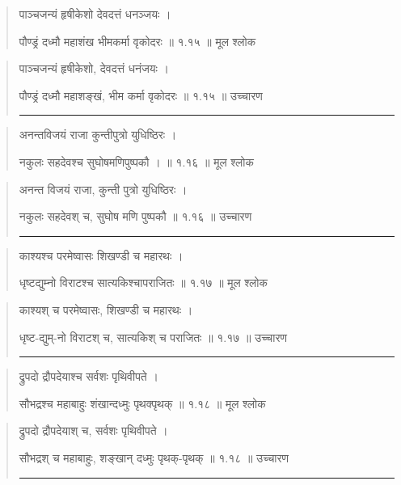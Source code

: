 \begin{quotation} 

पाञ्चजन्यं हृषीकेशो देवदत्तं धनञ्जयः  ।  

पौण्ड्रं दध्मौ महाशंख भीमकर्मा वृकोदरः  ॥ १.१५ ॥  मूल श्लोक
\end{quotation}

\begin{quotation}

पाञ्चजन्यं हृषीकेशो, देवदत्तं धनंजयः  ।  

पौण्ड्रं दध्मौ महाशङ्खं, भीम कर्मा वृकोदरः  ॥ १.१५ ॥  उच्चारण

\noindent\rule{16cm}{0.4pt} 
\end{quotation}


\begin{quotation} 

अनन्तविजयं राजा कुन्तीपुत्रो युधिष्ठिरः  ।  

नकुलः सहदेवश्च सुघोषमणिपुष्पकौ ।  
  ॥ १.१६ ॥  मूल श्लोक
\end{quotation}

\begin{quotation}

अनन्त विजयं राजा, कुन्ती पुत्रो युधिष्ठिरः  ।  

नकुलः सहदेवश् च, सुघोष मणि पुष्पकौ  ॥ १.१६ ॥  उच्चारण

\noindent\rule{16cm}{0.4pt} 
\end{quotation}


\begin{quotation} 
काश्यश्च परमेष्वासः शिखण्डी च महारथः  ।  

धृष्टद्युम्नो विराटश्च सात्यकिश्चापराजितः  ॥ १.१७ ॥  मूल श्लोक
\end{quotation}

\begin{quotation}

काश्यश् च परमेष्वासः, शिखण्डी च महारथः  ।  

धृष्ट-द्युम्-नो विराटश् च, सात्यकिश् च पराजितः  ॥ १.१७ ॥  उच्चारण

\noindent\rule{16cm}{0.4pt} 
\end{quotation}


\begin{quotation} 

द्रुपदो द्रौपदेयाश्च सर्वशः पृथिवीपते  ।  

सौभद्रश्च महाबाहुः शंखान्दध्मुः पृथक्पृथक्‌  ॥ १.१८ ॥  मूल श्लोक
\end{quotation}

\begin{quotation}

द्रुपदो द्रौपदेयाश् च, सर्वशः पृथिवीपते  ।  

सौभद्रश् च महाबाहुः, शङ्खान् दध्मुः पृथक्-पृथक्  ॥ १.१८ ॥  उच्चारण

\noindent\rule{16cm}{0.4pt} 
\end{quotation}


